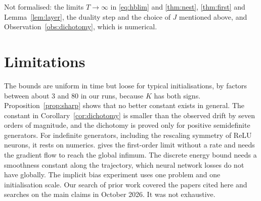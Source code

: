 \documentclass[11pt]{article}
\theoremstyle{remark}
\theoremstyle{definition}
\begin{document}
{Not formalised: the limits $T\to\infty$ in \eqref{eq:hblim} and \cref{thm:nest}, \cref{thm:first} and Lemma~\ref{lem:layer}, the duality step and the choice of $J$ mentioned above, and Observation~\ref{obs:dichotomy}, which is numerical.

}

\section{Limitations}

The bounds are uniform in time but loose for typical initialisations, by factors between about $3$ and $80$ in our runs, because $K$ has both signs. Proposition~\ref{prop:sharp} shows that no better constant exists in general. The constant in Corollary~\ref{cor:dichotomy} is smaller than the observed drift by seven orders of magnitude, and the dichotomy is proved only for positive semidefinite generators. For indefinite generators, including the rescaling symmetry of ReLU neurons, it rests on numerics.  gives the first-order limit without a rate and needs the gradient flow to reach the global infimum. The discrete energy bound needs a smoothness constant along the trajectory, which neural network losses do not have globally. The implicit bias experiment uses one problem and one initialisation scale. Our search of prior work covered the papers cited here and searches on the main claims in October 2026. It was not exhaustive.
\end{document}
